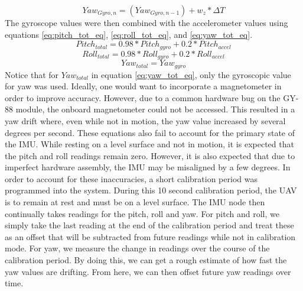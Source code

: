 \documentclass[english]{upeeei}
\begin{document}
\begin{equation}
    Yaw_{Gyro, n} = (Yaw_{Gyro, n-1}) + w_{z} * \Delta T
    \label{eq:gyro_yaw_eq}
\end{equation}
The gyroscope values were then combined with the accelerometer values using equations \ref{eq:pitch_tot_eq}, \ref{eq:roll_tot_eq}, and
\ref{eq:yaw_tot_eq}.
\begin{equation}
    Pitch_{total} = 0.98 * Pitch_{gyro} + 0.2 * Pitch_{accel}
    \label{eq:pitch_tot_eq}
\end{equation}
\begin{equation}
    Roll_{total} = 0.98 * Roll_{gyro} + 0.2 * Roll_{accel}
    \label{eq:roll_tot_eq}
\end{equation}
\begin{equation}
    Yaw_{total} = Yaw_{gyro}
    \label{eq:yaw_tot_eq}
\end{equation}
Notice that for \(Yaw_{total}\) in equation \ref{eq:yaw_tot_eq}, only the gyroscopic value for yaw was used. Ideally,
one would want to incorporate a magnetometer in order to improve accuracy. However, due to a common hardware bug on the GY-88 module, the
onboard magnetometer could not be accessed. This resulted in a yaw drift where, even while not in motion, the yaw value increased by several
degrees per second. These equations also fail to account for the primary state of the IMU. While resting on a level surface and not in motion,
it is expected that the pitch and roll readings remain zero. However, it is also expected that due to imperfect hardware assembly, the IMU may be
misaligned by a few degrees. In order to account for these inaccuracies, a short calibration period was programmed into the system.
During this 10 second calibration period, the UAV is to remain at rest and must be on a level surface. The IMU node then continually takes
readings for the pitch, roll and yaw. For pitch and roll, we simply take the last reading at the end of the calibration period and treat these
as an offset that will be subtracted from future readings while not in calibration mode. For yaw, we measure the change in readings over the
course of the calibration period. By doing this, we can get a rough estimate of how fast the yaw values are drifting. From here, we can then
offset future yaw readings over time.
\end{document}
